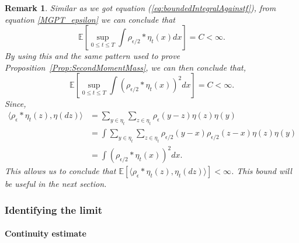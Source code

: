 \documentclass[12pt]{article}
\newtheorem{remark}[theorem]{Remark}
\newcommand{\IE}{\mathbb E}
\begin{document}
\begin{remark} \label{remark:BoundedIntegral}
Similar as we got equation (\ref{eq:boundedIntegralAgainstf}), from equation \ref{MGPT_epsilon} we can conclude that
\[ \IE\left[\sup_{0 \leq t \leq T} \int \rho_{\epsilon/2} * \eta_t(x) dx \right] = C < \infty. \]
By using this and the same pattern used to prove Proposition~\ref{Prop:SecondMomentMass}, we can then conclude that,
\[ \IE\left[  \sup_{0 \leq t \leq T} \int \left(\rho_{\epsilon/2} * \eta_t(x) \right)^2 dx \right] = C < \infty. \]
Since,
\begin{align*}
\langle \rho_\epsilon * \eta_t(z), \eta(dz) \rangle & = \sum_{y \in \eta_t} \sum_{z \in \eta_t} \rho_\epsilon(y-z) \eta(z) \eta(y) \\ &= \int  \sum_{y \in \eta_t} \sum_{z \in \eta_t} \rho_{\epsilon/2}(y-x) \rho_{\epsilon/2}(z-x) \eta(z) \eta(y) \\ &= \int (\rho_{\epsilon/2}*\eta_t(x))^2 dx.
\end{align*}
This allows us to conclude that $\IE[\langle \rho_\epsilon*\eta_t(z),\eta_t(dz) \rangle ] < \infty$. This bound will be useful in the next section.
\end{remark}

\subsubsection{Identifying the limit}

\paragraph{Continuity estimate}
\end{document}
